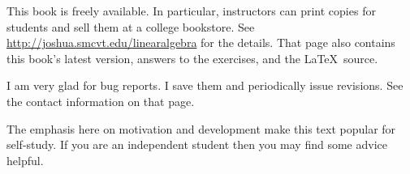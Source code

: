 \medskip
{}
This book is freely available.
In particular, instructors can print copies for students 
and sell them at a college bookstore.
See 
\url{http://joshua.smcvt.edu/linearalgebra}
for the details.
That page also contains this book's latest version,
answers to the exercises, and the \LaTeX\ source.

I am very glad for bug reports.
I save them and periodically issue revisions.
See the contact information on that page.


\newcommand{\classday}[1]{\textsc{#1}}
\newcommand{\colwidth}{1.35in}

\medskip
{}
%
The emphasis here on motivation and development make this text
popular for self-study.
If you are an independent student 
then you may find some advice helpful.

